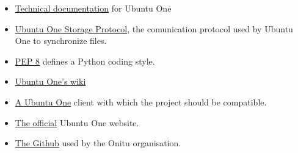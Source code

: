 \begin{itemize}
\renewcommand{\labelitemi}{$\bullet$}
\item \href{https://wiki.ubuntu.com/UbuntuOne/TechnicalDetails}{Technical documentation} for Ubuntu One
\item \href{http://bazaar.launchpad.net/~ubuntuone-control-tower/ubuntuone-storage-protocol/trunk/files}{Ubuntu One Storage Protocol}, the comunication protocol used by Ubuntu One to synchronize files.
\item \href{http://www.python.org/dev/peps/pep-0008/}{PEP 8} defines a Python coding style.
\item \href{https://wiki.ubuntu.com/UbuntuOne}{Ubuntu One's wiki}
\item
\href{http://bazaar.launchpad.net/~ubuntuone-control-tower/ubuntuone-client-gnome/trunk/files}{A Ubuntu One} client with which the project should be compatible.
\item \href{https://one.ubuntu.com/dashboard/}{The official} Ubuntu One website.
\item \href{https://github.com/onitu/}{The Github} used by the Onitu organisation.
\end{itemize}
